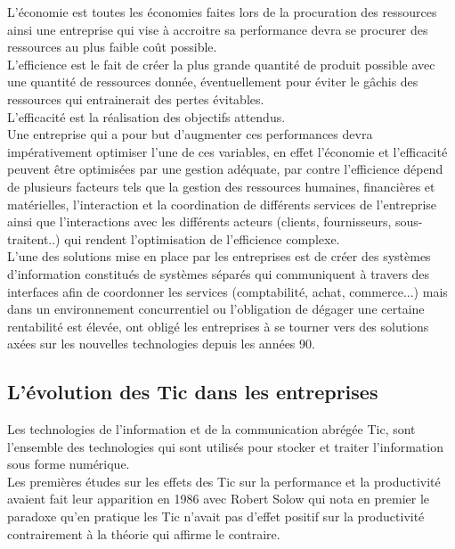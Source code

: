         L’économie est toutes les économies faites lors de la procuration des ressources ainsi une entreprise qui vise à accroitre sa performance devra se procurer des ressources au plus faible coût possible.\\

        L’efficience est le fait de créer la plus grande quantité de produit possible avec une quantité de ressources donnée, éventuellement pour éviter le gâchis des ressources qui entrainerait des pertes évitables.\\

        L’efficacité est la réalisation des objectifs attendus. \\

        Une entreprise qui a pour but d’augmenter ces performances devra impérativement optimiser l’une de ces variables, en effet l’économie et l’efficacité peuvent être optimisées par une gestion adéquate, par contre l’efficience dépend de plusieurs facteurs tels que la gestion des ressources humaines, financières et matérielles, l’interaction et la coordination de différents services de l’entreprise ainsi que l’interactions avec les différents acteurs (clients, fournisseurs, sous-traitent..) qui rendent l’optimisation de l’efficience complexe.\\

        L’une des solutions mise en place par les entreprises est de créer des systèmes d’information constitués de systèmes séparés qui communiquent à travers des interfaces afin de coordonner les services (comptabilité, achat, commerce...) mais dans un environnement concurrentiel ou l’obligation de dégager une certaine rentabilité est élevée, ont obligé les entreprises à se tourner vers des solutions axées sur les nouvelles technologies depuis les années 90.

    \subsection{L’évolution des Tic dans les entreprises}
        Les technologies de l’information et de la communication abrégée Tic, sont l’ensemble des technologies qui sont utilisés pour stocker et traiter l’information sous forme numérique.\\

        Les premières études sur les effets des Tic sur la performance et la productivité avaient fait leur apparition en 1986 avec Robert Solow qui nota en premier le paradoxe qu’en pratique les Tic n’avait pas d’effet positif sur la productivité contrairement à la théorie qui affirme le contraire.\\


